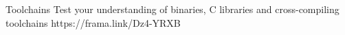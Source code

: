 \quizframe
{Toolchains}
{Test your understanding of binaries, C libraries and cross-compiling toolchains}
{https://frama.link/Dz4-YRXB}

